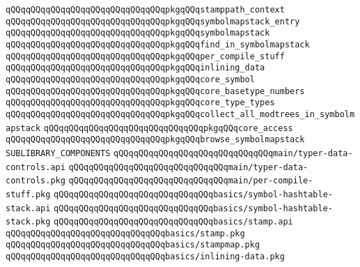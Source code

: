 \verb|qQQqqQQqqQQqqQQqqQQqqQQqqQQqqQQqpkgqQQqstamppath_context|\newline
\verb|qQQqqQQqqQQqqQQqqQQqqQQqqQQqqQQqpkgqQQqsymbolmapstack_entry|\newline
\verb|qQQqqQQqqQQqqQQqqQQqqQQqqQQqqQQqpkgqQQqsymbolmapstack|\newline
\verb|qQQqqQQqqQQqqQQqqQQqqQQqqQQqqQQqpkgqQQqfind_in_symbolmapstack|\newline
\verb|qQQqqQQqqQQqqQQqqQQqqQQqqQQqqQQqpkgqQQqper_compile_stuff|\newline
\verb|qQQqqQQqqQQqqQQqqQQqqQQqqQQqqQQqpkgqQQqinlining_data|\newline
\verb|qQQqqQQqqQQqqQQqqQQqqQQqqQQqqQQqpkgqQQqcore_symbol|\newline
\verb|qQQqqQQqqQQqqQQqqQQqqQQqqQQqqQQqpkgqQQqcore_basetype_numbers|\newline
\verb|qQQqqQQqqQQqqQQqqQQqqQQqqQQqqQQqpkgqQQqcore_type_types|\newline
\verb|qQQqqQQqqQQqqQQqqQQqqQQqqQQqqQQqpkgqQQqcollect_all_modtrees_in_symbolmapstack|\newline
\verb|qQQqqQQqqQQqqQQqqQQqqQQqqQQqqQQqpkgqQQqcore_access|\newline
\verb|qQQqqQQqqQQqqQQqqQQqqQQqqQQqqQQqpkgqQQqbrowse_symbolmapstack|\newline
\newline
\newline
\newline
\verb|SUBLIBRARY_COMPONENTS|\newline
\newline
\verb|qQQqqQQqqQQqqQQqqQQqqQQqqQQqqQQqmain/typer-data-controls.api|\newline
\verb|qQQqqQQqqQQqqQQqqQQqqQQqqQQqqQQqmain/typer-data-controls.pkg|\newline
\verb|qQQqqQQqqQQqqQQqqQQqqQQqqQQqqQQqmain/per-compile-stuff.pkg|\newline
\newline
\verb|qQQqqQQqqQQqqQQqqQQqqQQqqQQqqQQqbasics/symbol-hashtable-stack.api|\newline
\verb|qQQqqQQqqQQqqQQqqQQqqQQqqQQqqQQqbasics/symbol-hashtable-stack.pkg|\newline
\verb|qQQqqQQqqQQqqQQqqQQqqQQqqQQqqQQqbasics/stamp.api|\newline
\verb|qQQqqQQqqQQqqQQqqQQqqQQqqQQqqQQqbasics/stamp.pkg|\newline
\verb|qQQqqQQqqQQqqQQqqQQqqQQqqQQqqQQqbasics/stampmap.pkg|\newline
\verb|qQQqqQQqqQQqqQQqqQQqqQQqqQQqqQQqbasics/inlining-data.pkg|\newline
